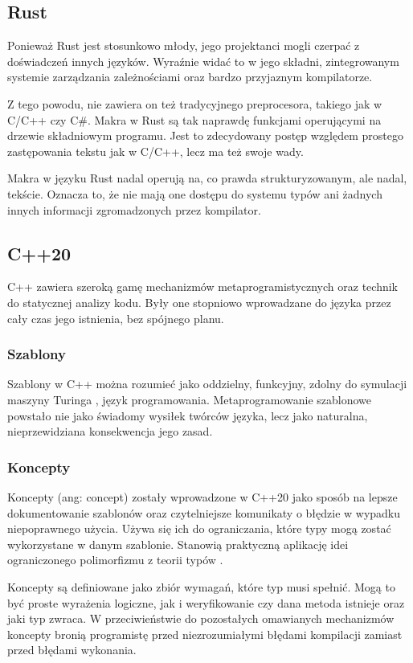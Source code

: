 \subsection {Rust}
Ponieważ Rust \cite{rust, klabnik2019rust} jest stosunkowo młody, jego projektanci mogli czerpać z doświadczeń innych języków. Wyraźnie widać to w jego składni, zintegrowanym systemie zarządzania zależnościami oraz bardzo przyjaznym kompilatorze.\par
Z tego powodu, nie zawiera on też tradycyjnego preprocesora, takiego jak w C/C++ czy C\#. Makra w Rust są tak naprawdę funkcjami operującymi na drzewie składniowym programu. Jest to zdecydowany postęp względem prostego zastępowania tekstu jak w C/C++, lecz ma też swoje wady.\par
Makra w języku Rust nadal operują na, co prawda strukturyzowanym, ale nadal, tekście. Oznacza to, że nie mają one dostępu do systemu typów ani żadnych innych informacji zgromadzonych przez kompilator.\par
\subsection{C++20}
C++ \cite{ISO:cpp20} zawiera szeroką gamę mechanizmów metaprogramistycznych oraz technik do statycznej analizy kodu. Były one stopniowo wprowadzane do języka przez cały czas jego istnienia, bez spójnego planu.\par
\subsubsection{Szablony}
Szablony w C++ można rozumieć jako oddzielny, funkcyjny, zdolny do symulacji maszyny Turinga \cite{template_turing_complete}, język programowania.
Metaprogramowanie szablonowe powstało nie jako świadomy wysiłek twórców języka, lecz jako naturalna, nieprzewidziana konsekwencja jego zasad.

\subsubsection{Koncepty}
Koncepty (ang: concept) zostały wprowadzone w C++20 \cite{ISO:cpp20} jako sposób na lepsze dokumentowanie szablonów oraz czytelniejsze komunikaty o błędzie w wypadku niepoprawnego użycia.
Używa się ich do ograniczania, które typy mogą zostać wykorzystane w danym szablonie.
Stanowią praktyczną aplikację idei ograniczonego polimorfizmu z teorii typów \cite{Cardelli85onunderstanding}.

Koncepty są definiowane jako zbiór wymagań, które typ musi spełnić.
Mogą to być proste wyrażenia logiczne, jak i weryfikowanie czy dana metoda istnieje oraz jaki typ zwraca.
W przeciwieństwie do pozostałych omawianych mechanizmów koncepty bronią programistę przed niezrozumiałymi błędami kompilacji zamiast przed błędami wykonania.

